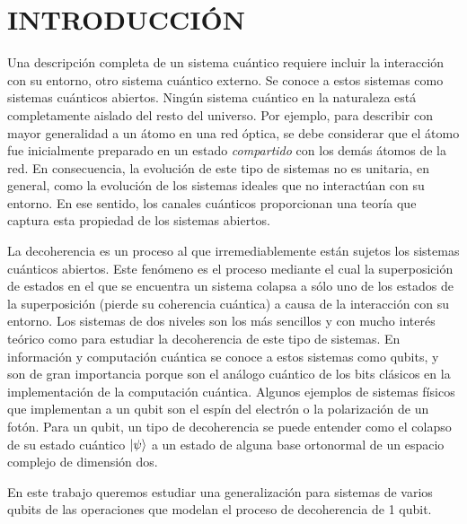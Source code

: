 \chapter{INTRODUCCIÓN}

Una descripción completa de un sistema cuántico requiere incluir la interacción
con su entorno, otro sistema cuántico externo. Se conoce a estos sistemas 
como sistemas cuánticos abiertos. Ningún sistema cuántico en la
naturaleza está completamente aislado del resto del universo.  
Por ejemplo, para describir con mayor generalidad a un átomo en una red óptica, se debe
considerar que el átomo fue inicialmente preparado en un estado \textit{compartido} 
con los demás átomos de la red. En consecuencia,
la evolución de este tipo de sistemas no es unitaria, en general, como 
la evolución de los sistemas ideales que no interactúan con su entorno. En ese sentido, 
los canales cuánticos proporcionan una teoría que captura esta propiedad de 
los sistemas abiertos. 


La decoherencia es un proceso al que irremediablemente están sujetos los 
sistemas cuánticos abiertos. 
Este fenómeno es el proceso mediante 
el cual la superposición de estados en el que se encuentra un sistema colapsa a 
sólo uno de los estados de la superposición (pierde su coherencia cuántica)
a causa de la interacción con su entorno. 
Los sistemas de dos niveles son 
los más sencillos y con mucho interés teórico como para estudiar 
la decoherencia de este tipo de sistemas. En información y computación 
cuántica se conoce a estos sistemas como qubits, y son de gran importancia 
porque son el análogo cuántico de los bits clásicos en 
la implementación de la computación cuántica. 
Algunos ejemplos de sistemas físicos que implementan a un qubit son el espín
del electrón o la polarización de un fotón. Para un qubit,
un tipo de decoherencia se puede entender como el colapso de su 
estado cuántico $\ket{\psi}$ 
a un estado de alguna base ortonormal de un espacio complejo de dimensión dos. 


En este trabajo queremos estudiar una generalización para sistemas de varios 
qubits de las operaciones que modelan el proceso de decoherencia de 1 qubit. 
